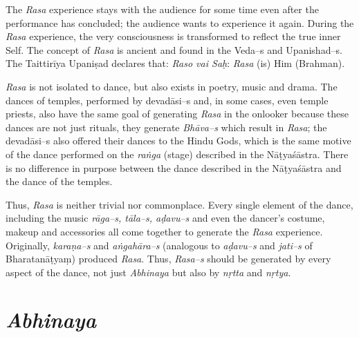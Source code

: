 The \textit{Rasa} experience stays with the audience for some time even after the performance has concluded; the audience wants to experience it again. During the \textit{Rasa} experience, the very consciousness is transformed to reflect the true inner Self. The concept of \textit{Rasa} is ancient and found in the Veda–s and Upanishad–s. The Taittirīya Upaniṣad declares that: \textit{Raso vai Saḥ}: \textit{Rasa} (is) Him (Brahman).

\newpage

\textit{Rasa} is not isolated to dance, but also exists in poetry, music and drama. The dances of temples, performed by devadāsi–s and, in some cases, even temple priests, also have the same goal of generating \textit{Rasa} in the onlooker because these dances are not just rituals, they generate \textit{Bhāva–s} which result in \textit{Rasa}; the devadāsi–s also offered their dances to the Hindu Gods, which is the same motive of the dance performed on the \textit{raṅga} (stage) described in the Nāṭyaśāstra. There is no difference in purpose between the dance described in the Nāṭyaśāstra and the dance of the temples.

Thus, \textit{Rasa} is neither trivial nor commonplace. Every single element of the dance, including the music \textit{rāga–s, tāla–s, aḍavu–s }and even the dancer’s costume, makeup and accessories all come together to generate the \textit{Rasa} experience. Originally, \textit{karaṇa–s }and \textit{aṅgahāra–s }(analogous to \textit{aḍavu–s} and \textit{jati–s} of Bharatanāṭyaṃ) produced \textit{Rasa}. Thus, \textit{Rasa–s} should be generated by every aspect of the dance, not just \textit{Abhinaya }but also by \textit{nṛtta} and \textit{nṛtya}.


\section*{\textit{Abhinaya}}

